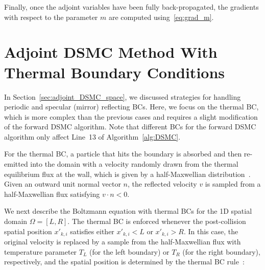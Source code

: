 \documentclass[12pt,nopreprintline]{elsarticle}
\begin{document}
Finally, once the adjoint variables have been fully back-propagated, the gradients with respect to the parameter $m$ are computed using~\eqref{eq:grad_m}.






\section{Adjoint DSMC Method With Thermal Boundary Conditions}
\label{sec:adjoint_DSMC_thermal}

In Section~\ref{sec:adjoint_DSMC_space}, we discussed strategies for handling periodic and specular (mirror) reflecting BCs. Here, we focus on the thermal BC, which is more complex than the previous cases and requires a slight modification of the forward DSMC algorithm. Note that different BCs for the forward DSMC algorithm only affect Line~13 of Algorithm~\ref{alg:DSMC}.

{For the thermal BC}, a particle that hits the boundary is absorbed and then re-emitted into the domain with a velocity randomly drawn from the thermal equilibrium flux at the wall, which is given by a half-Maxwellian distribution~\cite{pareschi2001introduction}. Given an  outward unit normal vector $n$, the reflected velocity $v$ is sampled from a half-Maxwellian flux satisfying $v \cdot n < 0$.

We next describe the Boltzmann equation with thermal BCs for the 1D spatial domain $\Omega = [L,R]$. The thermal BC is enforced whenever the post-collision spatial position $x'_{k,i}$ satisfies either $x'_{k,i} < L$ or $x'_{k,i} > R$. In this case, the original velocity is replaced by a sample from the half-Maxwellian flux with temperature parameter $T_L$ (for the left boundary) or $T_R$ (for the right boundary), respectively, and the spatial position is determined by the thermal BC rule~\cite[Alg.~6.3]{pareschi2001introduction}:
\end{document}

